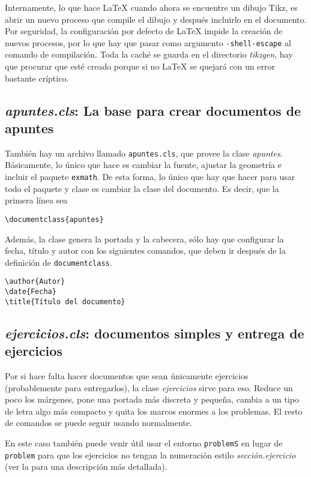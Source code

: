 Internamente, lo que hace LaTeX cuando ahora se encuentre un dibujo Tikz, es abrir un nuevo proceso que compile el dibujo y después incluirlo en el documento. Por seguridad, la configuración por defecto de LaTeX impide la creación de nuevos procesos, por lo que hay que pasar como argumento \texttt{-shell-escape} al comando de compilación. Toda la caché se guarda en el directorio \textit{tikzgen}, hay que procurar que esté creado porque si no LaTeX se quejará con un error bastante críptico.

\subsection{\textit{apuntes.cls}: La base para crear documentos de apuntes}
\label{sec:ApuntesCls}

También hay un archivo llamado \texttt{apuntes.cls}, que provee la clase \textit{apuntes}. Básicamente, lo único que hace es cambiar la fuente, ajustar la geometría e incluir el paquete \texttt{exmath}. De esta forma, lo único que hay que hacer para usar todo el paquete y clase es cambiar la clase del documento. Es decir, que la primera línea sea

\begin{verbatim}
\documentclass{apuntes}
\end{verbatim}

Además, la clase genera la portada y la cabecera, sólo hay que configurar la fecha, título y autor con los siguientes comandos, que deben ir después de la definición de \texttt{documentclass}.

\begin{verbatim}
\author{Autor}
\date{Fecha}
\title{Título del documento}
\end{verbatim}

\subsection{\textit{ejercicios.cls}: documentos simples y entrega de ejercicios}
\label{sec:EjerciciosCls}

Por si hace falta hacer documentos que sean únicamente ejercicios (probablemente para entregarlos), la clase \textit{ejercicios} sirve para eso. Reduce un poco los márgenes, pone una portada más discreta y pequeña, cambia a un tipo de letra algo más compacto y quita los marcos enormes a los problemas. El resto de comandos se puede seguir usando normalmente.

En este caso también puede venir útil usar el entorno \texttt{problemS} en lugar de \texttt{problem} para que los ejercicios no tengan la numeración estilo \textit{sección.ejercicio} (ver la  para una descripción más detallada).

